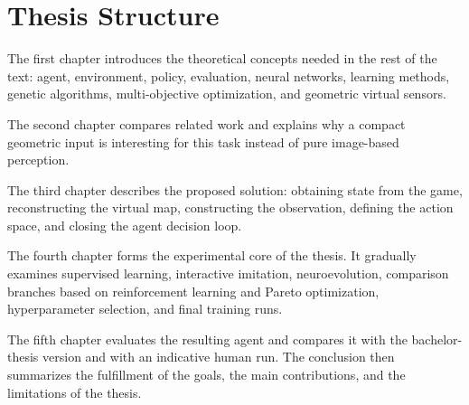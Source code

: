 \section*{Thesis Structure}

The first chapter introduces the theoretical concepts needed in the rest of the text: agent, environment, policy, evaluation, neural networks, learning methods, genetic algorithms, multi-objective optimization, and geometric virtual sensors.

The second chapter compares related work and explains why a compact geometric input is interesting for this task instead of pure image-based perception.

The third chapter describes the proposed solution: obtaining state from the game, reconstructing the virtual map, constructing the observation, defining the action space, and closing the agent decision loop.

The fourth chapter forms the experimental core of the thesis. It gradually examines supervised learning, interactive imitation, neuroevolution, comparison branches based on reinforcement learning and Pareto optimization, hyperparameter selection, and final training runs.

The fifth chapter evaluates the resulting agent and compares it with the bachelor-thesis version and with an indicative human run. The conclusion then summarizes the fulfillment of the goals, the main contributions, and the limitations of the thesis.
